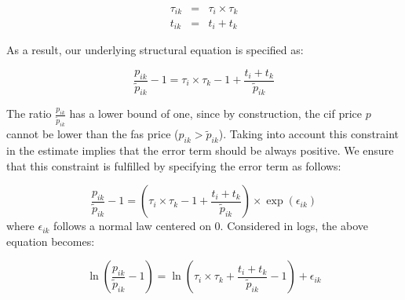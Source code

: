 \documentclass[a4paper,11pt]{article}
\begin{document}
\begin{eqnarray}
\tau_{ik} &=& \tau_{i} \times \tau_{k} \label{eq:ad-valorem}\\
t_{ik} &=& t_{i} + t_{k} \label{eq:add}
\end{eqnarray}

\noindent As a result, our underlying structural equation is specified as:

\begin{equation*}
\frac{p_{ik}}{\widetilde{p}_{ik}}-1 =\tau_{i} \times \tau_{k} -1 +\frac{t_{i} + t_{k}}{ \widetilde{p}_{ik}} \label{eq:theory_equation}
\end{equation*}

The ratio $\frac{p_{ik}}{\widetilde{p}_{ik}}$ has a lower bound of one, since by construction, the cif price $p$ cannot be lower than the fas price ($p_{ik}>\widetilde{p}_{ik}$).
Taking into account this constraint in the estimate implies that the error term should be always positive.
We ensure that this constraint is fulfilled by specifying the error term as follows:

\begin{equation*}
\frac{p_{ik}}{\widetilde{p}_{ik}}-1 =\left(\tau_{i} \times \tau_{k} -1+\frac{t_{i} + t_{k}}{\widetilde{p}_{ik}} \right)\times \exp(\epsilon_{ik})
\end{equation*}
\noindent where $\epsilon_{ik}$ follows a normal law centered on 0.
Considered in logs, the above equation becomes:

\begin{equation}
\ln\left(\frac{p_{ik}}{\widetilde{p}_{ik}}-1 \right)= \ln \left(\tau_{i} \times \tau_{k}+\frac{t_{i} + t_{k}}{\widetilde{p}_{ik}}-1 \right) + \epsilon_{ik} \label{eq:equation0}
\end{equation}
\end{document}
